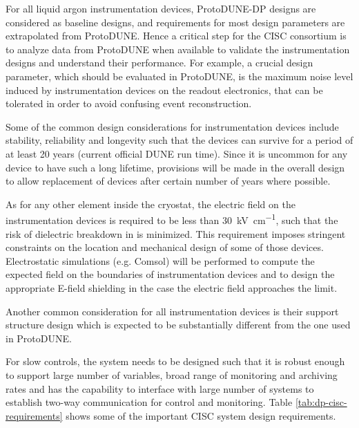 
For all liquid argon instrumentation devices, ProtoDUNE-DP designs are
considered as baseline designs, and requirements for most design
parameters are extrapolated from ProtoDUNE. Hence a critical step for
the CISC consortium is to analyze data from ProtoDUNE when available
to validate the instrumentation designs and understand their
performance. For example, a crucial design parameter, which should be evaluated in ProtoDUNE,
is the maximum noise level induced by instrumentation devices on the readout electronics, that can be tolerated 
in order to avoid confusing event reconstruction. 

Some of the common design considerations for
instrumentation devices include stability, reliability and longevity
such that the devices can survive for a period of at least 20 years
(current official DUNE run time).  Since it is uncommon for any device
to have such a long lifetime, provisions will be made in the overall
design to allow replacement of devices after certain number of
years where possible.

As for any other element inside the cryostat, 
the electric field on the instrumentation devices is 
required to be less than \SI{30}{kV\per\cm},
such that the risk of dielectric breakdown in  is minimized.
This requirement imposes stringent constraints on the location and mechanical 
design of some of those devices. Electrostatic simulations (e.g. Comsol) 
will be performed to compute the expected field on the boundaries of 
instrumentation devices and to design the appropriate E-field shielding
in the case the electric field approaches the limit. 

Another common consideration for all instrumentation devices is their support structure
design which is expected to be substantially different from the one used in ProtoDUNE.

For slow controls, the system needs to be designed such that it is
robust enough to support large number of variables, broad range of
monitoring and archiving rates and has the capability to interface
with large number of systems to establish two-way communication for
control and monitoring. Table \ref{tab:dp-cisc-requirements} shows
some of the important CISC system design requirements.





